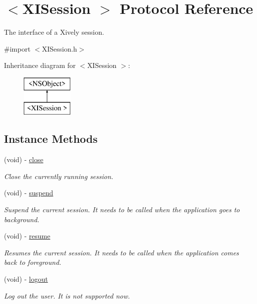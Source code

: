 \hypertarget{protocol_x_i_session_01-p}{}\section{$<$X\+I\+Session $>$ Protocol Reference}
\label{protocol_x_i_session_01-p}


The interface of a Xively session.  




{\ttfamily \#import $<$X\+I\+Session.\+h$>$}

Inheritance diagram for $<$X\+I\+Session $>$\+:\begin{figure}[H]
\begin{center}
\leavevmode
\includegraphics[height=2.000000cm]{protocol_x_i_session_01-p}
\end{center}
\end{figure}
\subsection*{Instance Methods}
\begin{DoxyCompactItemize}
\item 
(void) -\/ \hyperlink{protocol_x_i_session_01-p_a8f423fa580b199179874b97c65486ae8}{close}
\begin{DoxyCompactList}\small\item\em Close the currently running session. \end{DoxyCompactList}\item 
(void) -\/ \hyperlink{protocol_x_i_session_01-p_ac2e106468605a7b34c07a5a156c13f34}{suspend}
\begin{DoxyCompactList}\small\item\em Suspend the current session. It needs to be called when the application goes to background. \end{DoxyCompactList}\item 
(void) -\/ \hyperlink{protocol_x_i_session_01-p_a9808406f72e19472b687769dc01886c3}{resume}
\begin{DoxyCompactList}\small\item\em Resumes the current session. It needs to be called when the application comes back to foreground. \end{DoxyCompactList}\item 
(void) -\/ \hyperlink{protocol_x_i_session_01-p_a614f196c8dc33e050e0635bfafbfee4d}{logout}
\begin{DoxyCompactList}\small\item\em Log out the user. It is not supported now. \end{DoxyCompactList}\end{DoxyCompactItemize}
